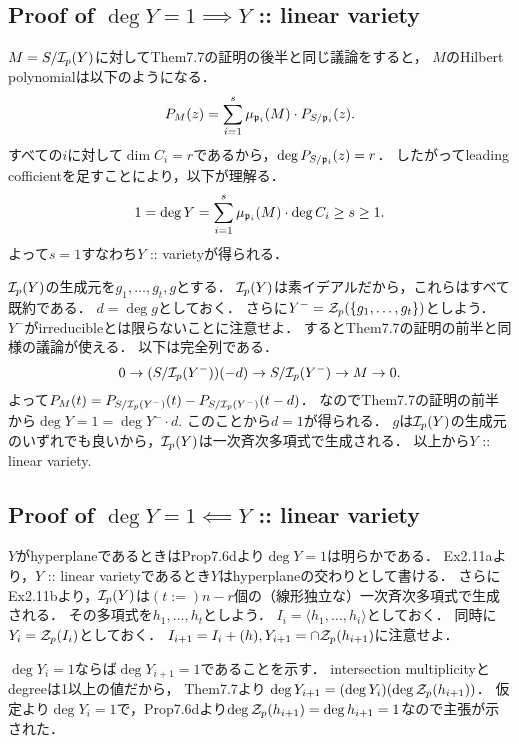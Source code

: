 \documentclass[a4paper]{jsarticle}
\begin{document}
    \subsection{Proof of $\deg Y=1 \implies Y$ :: linear variety}
    $M=S/\mathcal{I}_p(Y)$に対してThem7.7の証明の後半と同じ議論をすると，
    $M$のHilbert polynomialは以下のようになる．
    \[ P_M(z)=\sum_{i=1}^{s} \mu_{\mathfrak{p}_i}(M) \cdot P_{S/\mathfrak{p}_i}(z). \]
    すべての$i$に対して$\dim C_i=r$であるから，$\deg P_{S/\mathfrak{p}_i}(z)=r$．
    したがってleading cofficientを足すことにより，以下が理解る．
    \[ 1=\deg Y=\sum_{i=1}^s \mu_{\mathfrak{p}_i}(M) \cdot \deg C_i \geq s \geq 1. \]
    よって$s=1$すなわち$Y$ :: varietyが得られる．

    $\mathcal{I}_p(Y)$の生成元を$g_1,\dots,g_t,g$とする．
    $\mathcal{I}_p(Y)$は素イデアルだから，これらはすべて既約である．
    $d=\deg g$としておく．
    さらに$Y^-=\mathcal{Z}_p(\{g_1,\dots,g_t\})$としよう．
    $Y^-$がirreducibleとは限らないことに注意せよ．
    するとThem7.7の証明の前半と同様の議論が使える．
    以下は完全列である．
    \[ 0 \to (S/\mathcal{I}_p(Y^-))(-d) \to S/\mathcal{I}_p(Y^-) \to M \to 0. \]
    よって$P_{M}(t)=P_{S/\mathcal{I}_p(Y^-)}(t)-P_{S/\mathcal{I}_p(Y^-)}(t-d)$．
    なのでThem7.7の証明の前半から$\deg Y=1=\deg Y^- \cdot d$.
    このことから$d=1$が得られる．
    $g$は$\mathcal{I}_p(Y)$の生成元のいずれでも良いから，$\mathcal{I}_p(Y)$は一次斉次多項式で生成される．
    以上から$Y$ :: linear variety.


    \subsection{Proof of $\deg Y=1 \impliedby Y$ :: linear variety}
    $Y$がhyperplaneであるときはProp7.6dより$\deg Y=1$は明らかである．
    Ex2.11aより，$Y$ :: linear varietyであるとき$Y$はhyperplaneの交わりとして書ける．
    さらにEx2.11bより，$\mathcal{I}_p(Y)$は$(t:=)n-r$個の（線形独立な）一次斉次多項式で生成される．
    その多項式を$h_1,\dots,h_t$としよう．
    $I_i=\langle h_1,\dots,h_i \rangle$としておく．
    同時に$Y_i=\mathcal{Z}_p(I_i)$としておく．
    $I_{i+1}=I_i+(h), Y_{i+1}=\cap \mathcal{Z}_p(h_{i+1})$に注意せよ．

    $\deg Y_i=1$ならば$\deg Y_{i+1}=1$であることを示す．
    intersection multiplicityとdegreeは1以上の値だから，
    Them7.7より
    $\deg Y_{i+1}=(\deg Y_i)(\deg \mathcal{Z}_p(h_{i+1}))$．
    仮定より$\deg Y_i=1$で，Prop7.6dより$\deg \mathcal{Z}_p(h_{i+1})=\deg h_{i+1}=1$なので主張が示された．
\end{document}
